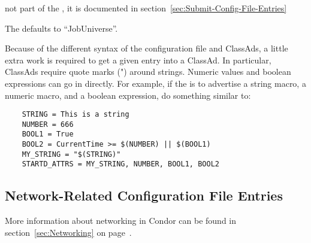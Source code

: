 \begin{description}
   not part of the , it is
  documented in section~\ref{sec:Submit-Config-File-Entries}

  The   defaults to
  ``JobUniverse''.

  Because of the different syntax of the configuration
  file and ClassAds, a little extra work is required to get a
  given entry into a ClassAd.  In particular, ClassAds require quote
  marks (") around strings.  Numeric values and boolean expressions
  can go in directly.  
  For example, if the  is to advertise a string macro, a numeric
  macro, and a boolean expression, do something similar to:

  \begin{verbatim}
    STRING = This is a string 
    NUMBER = 666
    BOOL1 = True
    BOOL2 = CurrentTime >= $(NUMBER) || $(BOOL1)
    MY_STRING = "$(STRING)"
    STARTD_ATTRS = MY_STRING, NUMBER, BOOL1, BOOL2
  \end{verbatim}

\end{description}

\subsection{\label{sec:Network-Related-Config-File-Entries}Network-Related Configuration File Entries}

More information about networking in Condor can be found in
section~\ref{sec:Networking} on page~\pageref{sec:Networking}.

